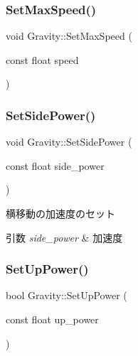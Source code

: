 \subsubsection{\texorpdfstring{Set\+Max\+Speed()}{SetMaxSpeed()}}
{\footnotesize\ttfamily void Gravity\+::\+Set\+Max\+Speed (\begin{DoxyParamCaption}\item[{const float}]{speed }\end{DoxyParamCaption})\hspace{0.3cm}{\ttfamily [inline]}}

\mbox{\label{class_gravity_a76503b3788b696748828f6e48556b9ab}} 
\subsubsection{\texorpdfstring{Set\+Side\+Power()}{SetSidePower()}}
{\footnotesize\ttfamily void Gravity\+::\+Set\+Side\+Power (\begin{DoxyParamCaption}\item[{const float}]{side\+\_\+power }\end{DoxyParamCaption})\hspace{0.3cm}{\ttfamily [inline]}}



横移動の加速度のセット 


\begin{DoxyParams}{引数}
{\em side\+\_\+power} & 加速度 \\
\hline
\end{DoxyParams}
\mbox{\label{class_gravity_ace00a42ac3fc74608e77cffa7f39baae}} 
\subsubsection{\texorpdfstring{Set\+Up\+Power()}{SetUpPower()}}
{\footnotesize\ttfamily bool Gravity\+::\+Set\+Up\+Power (\begin{DoxyParamCaption}\item[{const float}]{up\+\_\+power }\end{DoxyParamCaption})\hspace{0.3cm}{\ttfamily [inline]}}



